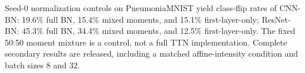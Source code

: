Seed-0 normalization controls on PneumoniaMNIST yield class-flip rates of CNN-BN: 19.6\% full BN, 15.4\% mixed moments, and 15.1\% first-layer-only; ResNet-BN: 45.3\% full BN, 34.4\% mixed moments, and 12.5\% first-layer-only. The fixed 50:50 moment mixture is a control, not a full TTN implementation. Complete secondary results are released, including a matched affine-intensity condition and batch sizes 8 and 32.
